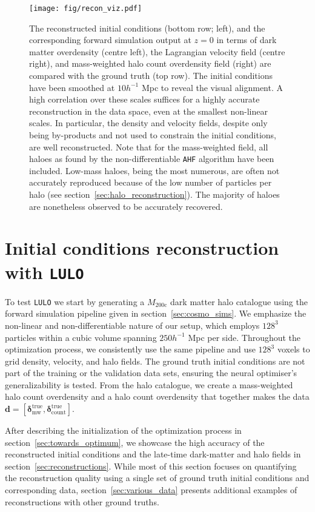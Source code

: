 \begin{figure*}
    \centering
    \texttt{[image: fig/recon\_viz.pdf]}

    \caption{The reconstructed initial conditions (bottom row; left), and the corresponding forward simulation output at $z=0$ in terms of dark matter overdensity (centre left), the Lagrangian velocity field (centre right), and mass-weighted halo count overdensity field (right) are compared with the ground truth (top row). The initial conditions have been smoothed at $10h^{-1}$ Mpc to reveal the visual alignment. A high correlation over these scales suffices for a highly accurate reconstruction in the data space, even at the smallest non-linear scales. In particular, the density and velocity fields, despite only being by-products and not used to constrain the initial conditions, are well reconstructed. Note that for the mass-weighted field, all haloes as found by the non-differentiable \texttt{AHF} algorithm have been included. Low-mass haloes, being the most numerous, are often not accurately reproduced because of the low number of particles per halo (see section~\ref{sec:halo_reconstruction}). The majority of haloes are nonetheless observed to be accurately recovered.}
\label{fig:reconstruction_viz}
\end{figure*}


\section{Initial conditions reconstruction with \texttt{LULO}}
\label{sec:demonstration}

To test \texttt{LULO} we start by generating a $M_{200\mathrm{c}}$ dark matter halo catalogue using the forward simulation pipeline given in section~\ref{sec:cosmo_sims}. We emphasize the non-linear and non-differentiable nature of our setup, which employs $128^3$ particles within a cubic volume spanning $250h^{-1}$ Mpc per side. Throughout the optimization process, we consistently use the same pipeline and use $128^3$ voxels to grid density, velocity, and halo fields. The ground truth initial conditions are not part of the training or the validation data sets, ensuring the neural optimiser's generalizability is tested. From the halo catalogue, we create a mass-weighted halo count overdensity and a halo count overdensity that together makes the data $\mathbf{d} = [\boldsymbol \delta^{\mathrm{true}}_{\mathrm{mw}},\boldsymbol \delta^{\mathrm{true}}_{\mathrm{count}}]$. 

After describing the initialization of the optimization process in section~\ref{sec:towards_optimum}, we showcase the high accuracy of the reconstructed initial conditions and the late-time dark-matter and halo fields in section~\ref{sec:reconstructions}. While most of this section focuses on quantifying the reconstruction quality using a single set of ground truth initial conditions and corresponding data, section~\ref{sec:various_data} presents additional examples of reconstructions with other ground truths.



